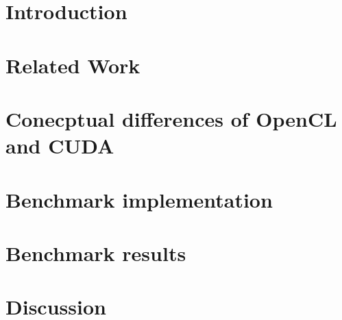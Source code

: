 \section{Introduction}

\pagebreak

\section{Related Work}

\pagebreak

\section{Conecptual differences of OpenCL and CUDA}

\pagebreak

\pagebreak
\section{Benchmark implementation}

\pagebreak

\pagebreak
\section{Benchmark results}

\pagebreak

\section{Discussion}
